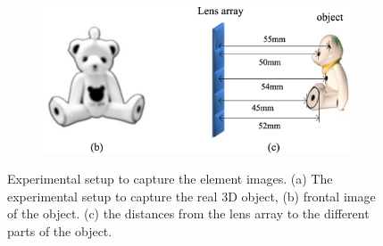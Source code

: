 \documentclass[10pt,letterpaper]{article}
\begin{document}
\begin{figure}[!htb]
    \begin{subfigure}[b]{0.7\linewidth}
        \includegraphics[width=1\linewidth]{fig_18b} 
   \end{subfigure}
\caption{Experimental setup to capture the element images. (a) The experimental setup to capture the real 3D object, (b) frontal image of the object. (c) the distances from the lens array to the different parts of the object.}
\label{fig_18}
\end{figure}
\end{document}
